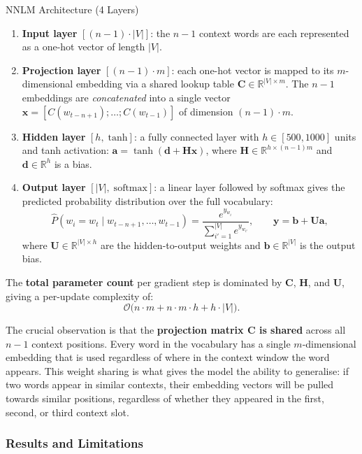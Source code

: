 \documentclass[11pt,a4paper]{article}
\begin{document}
\begin{thmbox}{NNLM Architecture (4 Layers)}
\begin{enumerate}
  \item \textbf{Input layer} $[(n-1)\cdot|V|]$: the $n-1$ context words are each represented as a one-hot vector of length $|V|$.
  \item \textbf{Projection layer} $[(n-1)\cdot m]$: each one-hot vector is mapped to its $m$-dimensional embedding via a shared lookup table $\mathbf{C} \in \mathbb{R}^{|V|\times m}$. The $n-1$ embeddings are \emph{concatenated} into a single vector $\mathbf{x} = [C(w_{t-n+1}); \ldots; C(w_{t-1})]$ of dimension $(n-1)\cdot m$.
  \item \textbf{Hidden layer} $[h,\;\text{tanh}]$: a fully connected layer with $h \in [500, 1000]$ units and tanh activation: $\mathbf{a} = \tanh(\mathbf{d} + \mathbf{H}\mathbf{x})$, where $\mathbf{H} \in \mathbb{R}^{h \times (n-1)m}$ and $\mathbf{d} \in \mathbb{R}^h$ is a bias.
  \item \textbf{Output layer} $[|V|,\;\text{softmax}]$: a linear layer followed by softmax gives the predicted probability distribution over the full vocabulary:
  \[
    \hat{P}(w_i = w_t \mid w_{t-n+1},\ldots,w_{t-1}) = \frac{e^{y_{w_i}}}{\sum_{i'=1}^{|V|}e^{y_{w_{i'}}}},
    \qquad \mathbf{y} = \mathbf{b} + \mathbf{U}\mathbf{a},
  \]
  where $\mathbf{U} \in \mathbb{R}^{|V|\times h}$ are the hidden-to-output weights and $\mathbf{b} \in \mathbb{R}^{|V|}$ is the output bias.
\end{enumerate}
The \textbf{total parameter count} per gradient step is dominated by $\mathbf{C}$, $\mathbf{H}$, and $\mathbf{U}$, giving a per-update complexity of:
\[
  \mathcal{O}\bigl(n \cdot m + n \cdot m \cdot h + h \cdot |V|\bigr).
\]
\end{thmbox}

The crucial observation is that the \textbf{projection matrix $\mathbf{C}$ is shared} across all $n-1$ context positions. Every word in the vocabulary has a single $m$-dimensional embedding that is used regardless of where in the context window the word appears. This weight sharing is what gives the model the ability to generalise: if two words appear in similar contexts, their embedding vectors will be pulled towards similar positions, regardless of whether they appeared in the first, second, or third context slot.

\subsubsection{Results and Limitations}
\end{document}
